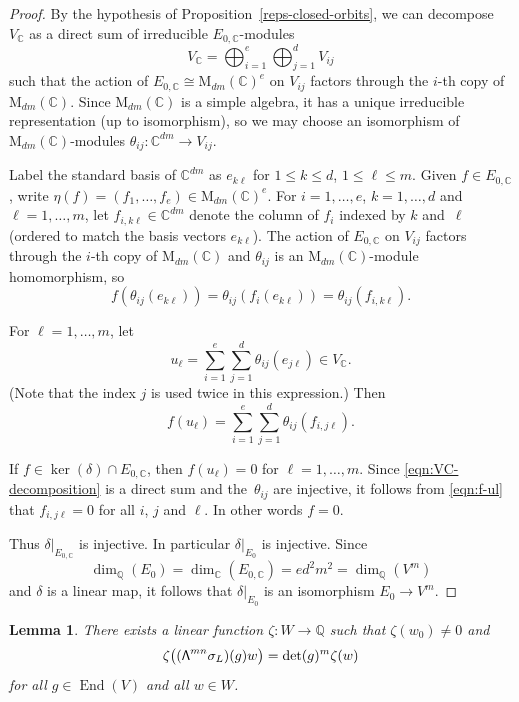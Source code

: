 \documentclass[11pt]{article}
\numberwithin{equation}{section}
\newcommand\bw{{\hbox{\large$\mathsf{\Lambda}$}}}
\newcommand{\bC}{\mathbb{C}}
\newcommand{\bQ}{\mathbb{Q}}
\newcommand{\rM}{\mathrm{M}}
\DeclareMathOperator{\End}{End}
\let\extpower\bw
\newtheorem{lemma}{Lemma}[section]
\begin{document}
\begin{proof}
By the hypothesis of Proposition~\ref{reps-closed-orbits}, we can decompose $V_\bC$ as a direct sum of irreducible $E_{0,\bC}$-modules
\begin{equation} \label{eqn:VC-decomposition}
V_\bC = \bigoplus_{i=1}^e \bigoplus_{j=1}^d V_{ij}
\end{equation}
such that the action of $E_{0,\bC} \cong \rM_{dm}(\bC)^e$ on $V_{ij}$ factors through the $i$-th copy of $\rM_{dm}(\bC)$.
Since $\rM_{dm}(\bC)$ is a simple algebra, it has a unique irreducible representation (up to isomorphism), so we may choose an isomorphism of $\rM_{dm}(\bC)$-modules $\theta_{ij} \colon \bC^{dm} \to V_{ij}$.

Label the standard basis of $\bC^{dm}$ as $e_{k\ell}$ for $1 \leq k \leq d$, $1 \leq \ell \leq m$.
Given $f \in E_{0,\bC}$, write $\eta(f) = (f_1, \dotsc, f_e) \in \rM_{dm}(\bC)^e$.
For $i = 1, \dotsc, e$, $k = 1, \dotsc, d$ and $\ell = 1, \dotsc, m$, let $f_{i,k\ell} \in \bC^{dm}$ denote the column of $f_i$ indexed by $k$ and~$\ell$ (ordered to match the basis vectors $e_{k\ell}$).
The action of $E_{0,\bC}$ on $V_{ij}$ factors through the $i$-th copy of $\rM_{dm}(\bC)$ and $\theta_{ij}$ is an $\rM_{dm}(\bC)$-module homomorphism, so
\[
f(\theta_{ij}(e_{k\ell})) = \theta_{ij}(f_i(e_{k\ell})) = \theta_{ij}(f_{i,k\ell}).
\]

For $\ell = 1, \dotsc, m$, let
\[
u_\ell = \sum_{i=1}^e \sum_{j=1}^d \theta_{ij}(e_{j\ell}) \in V_\bC.
\]
(Note that the index $j$ is used twice in this expression.)
Then
\begin{equation} \label{eqn:f-ul}
f(u_\ell) = \sum_{i=1}^e \sum_{j=1}^d \theta_{ij}(f_{i,j\ell}).
\end{equation}

If $f \in \ker(\delta) \cap E_{0,\bC}$, then $f(u_\ell) = 0$ for $\ell = 1, \dotsc, m$.
Since \eqref{eqn:VC-decomposition} is a direct sum and the~$\theta_{ij}$ are injective, it follows from \eqref{eqn:f-ul} that $f_{i,j\ell} = 0$ for all $i$, $j$ and $\ell$. In other words $f=0$.

Thus $\delta|_{E_{0,\bC}}$ is injective. In particular $\delta|_{E_0}$ is injective.
Since
\[
\dim_\bQ(E_0) = \dim_\bC(E_{0,\bC}) = ed^2m^2 = \dim_\bQ(V^m)
\]
and $\delta$ is a linear map, it follows that $\delta|_{E_0}$ is an isomorphism $E_0 \to V^m$.
\end{proof}

\begin{lemma}
There exists a linear function $\zeta \colon W \to \bQ$ such that $\zeta(w_0) \neq 0$ and
\[
\zeta \bigl( (\extpower^{mn} \sigma_L)(g)w \bigr) = \det(g)^m \zeta(w)
\]
for all $g \in \End(V)$ and all $w \in W$.
\end{lemma}
\end{document}
